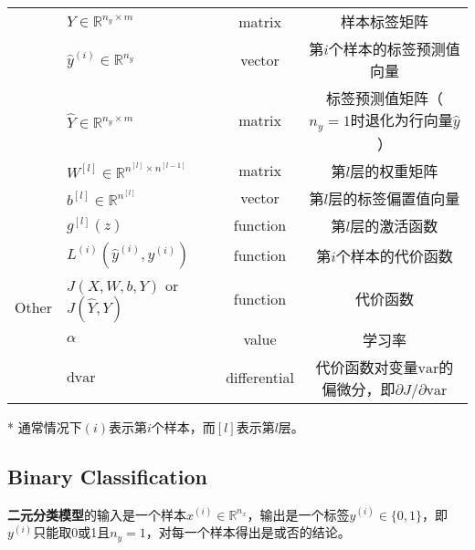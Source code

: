 \begin{table}[ht]
\begin{threeparttable}
\begin{tabular}{clcc}
									& $Y \in {\mathbb{R}^{n_y \times m}}$                   & matrix               & 样本标签矩阵                                                           \\									
									& $\hat{y}^{(i)} \in \mathbb{R}^{n_y}$                  & vector               & 第$i$个样本的标签预测值向量                                                \\
									& $\hat{Y} \in {\mathbb{R}^{n_y \times m}}$             & matrix               & 标签预测值矩阵（$n_y=1$时退化为行向量$\hat{y}$）   						\\
									& $W^{[l]} \in \mathbb{R}^{n^{[l]} \times n^{[l-1]}}$   & matrix               & 第$l$层的权重矩阵                                                               \\
									& $b^{[l]} \in \mathbb{R}^{n^{[l]}}$                    & vector               & 第$l$层的标签偏置值向量                                                        \\\hline
		\multirow{5}{*}{Other}      & $g^{[l]}(z)$                                          & function             & 第$l$层的激活函数                                                         \\
									& $L^{(i)}(\hat{y}^{(i)}, y^{(i)})$                     & function             & 第$i$个样本的代价函数                                                         \\
									& $J(X,W,b,Y)$ or $J(\hat{Y},Y)$                        & function             & 代价函数                                                                        \\
									& $\alpha$								                & value                & 学习率                                                                        \\
									& $\mathrm{d}\mathrm{var}$                              & differential         & 代价函数对变量$\mathrm{var}$的偏微分，即${\partial J}/{\partial \mathrm{var}}$ \\ \hline
	\end{tabular}
	\label{tab:notations} %
	\begin{tablenotes}
		\item[*] 通常情况下$(i)$表示第$i$个样本，而$[l]$表示第$l$层。
	\end{tablenotes}
	\end{threeparttable}
\end{table}

\subsection{Binary Classification}
\textbf{二元分类模型}的输入是一个样本$x^{(i)} \in \mathbb{R}^{n_x}$，输出是一个标签$y^{(i)} \in \{0, 1\}$，即$y^{(i)}$只能取0或1且$n_y=1$，对每一个样本得出是或否的结论。

